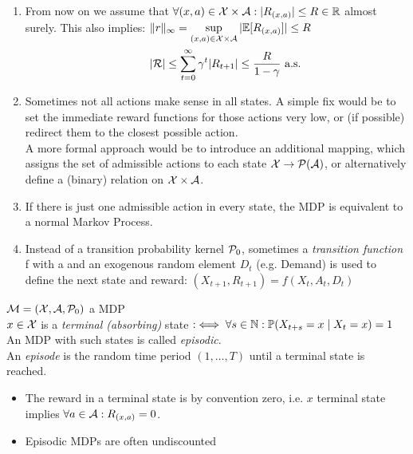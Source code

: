 \begin{remark}\leavevmode
\begin{enumerate}
	\item From now on we assume that \(\forall (x,a)\in\mathcal{X}\times\mathcal{A}:|R_{(x,a)}|\le R\in\mathbb{R}\) almost surely. This also implies: 			\(
	\begin{aligned}[t]
		&\|r\|_{\infty}=\sup_{(x,a)\in\mathcal{X}\times\mathcal{A}}|\mathbb{E}[R_{(x,a)}]|\le R\\
		&|\mathcal{R}|\le\sum_{t=0}^\infty \gamma^t |R_{t+1}|\le \frac{R}{1-\gamma} \text{ a.s.}
	\end{aligned}
	\)
	\item Sometimes not all actions make sense in all states. A simple fix would be to set the immediate reward functions for those actions very low, or (if possible) redirect them to the closest possible action. \\
	A more formal approach would be to introduce an additional mapping, which assigns the set of admissible actions to each state \(\mathcal{X}\to\mathcal{P}(\mathcal{A})\), or alternatively define a (binary) relation on \(\mathcal{X}\times\mathcal{A}\).
	\item If there is just one admissible action in every state, the MDP is equivalent to a normal Markov Process.
	\item Instead of a transition probability kernel \(\mathcal{P}_0\), sometimes a \emph{transition function} f with a and an exogenous random element \(D_t\) (e.g. Demand) is used to define the next state and reward: \((X_{t+1},R_{t+1})=f(X_t,A_t,D_t)\) 
\end{enumerate}
\end{remark}
\begin{definition}\(\mathcal{M}=(\mathcal{X},\mathcal{A},\mathcal{P}_0)\) a MDP\\
	\(x\in\mathcal{X}\) is a \emph{terminal (absorbing)} state \(:\iff \forall s\in\mathbb{N}: \mathbb{P}(X_{t+s}=x\mid X_t=x)=1\)\\
	An MDP with such states is called \emph{episodic}.\\
	An \emph{episode} is the random time period \((1,\dots,T)\) until a terminal state is reached.
\end{definition}
\begin{remark}\leavevmode
	\begin{itemize}
		\item The reward in a terminal state is by convention zero, i.e. \(x\) terminal state implies \(\forall a\in\mathcal{A}: R_{(x,a)}=0\).
		\item Episodic MDPs are often undiscounted
	\end{itemize}	
\end{remark}

